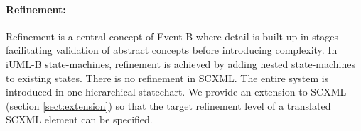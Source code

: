 
\paragraph{Refinement:}
Refinement is a central concept of Event-B where detail is built up in stages facilitating validation of abstract concepts before introducing complexity. 
In iUML-B state-machines, refinement is achieved by adding nested state-machines to existing states.
There is no refinement in SCXML. The entire system is introduced in one hierarchical statechart. We provide an extension to SCXML (section \ref{sect:extension}) so that the target refinement level of a translated SCXML element can be specified.



%
%

